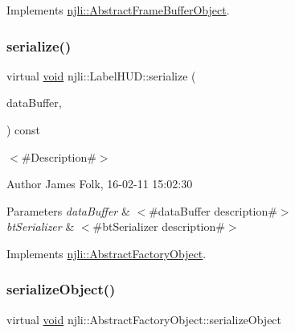 Implements \mbox{\hyperlink{classnjli_1_1_abstract_frame_buffer_object_aa75a537f5745e4be8f749892d195b43c}{njli\+::\+Abstract\+Frame\+Buffer\+Object}}.

\mbox{\label{classnjli_1_1_label_h_u_d_abfd2e24d591c7a69305b30d271b38a77}} 
\subsubsection{\texorpdfstring{serialize()}{serialize()}}
{\footnotesize\ttfamily virtual \mbox{\hyperlink{_thread_8h_af1e856da2e658414cb2456cb6f7ebc66}{void}} njli\+::\+Label\+H\+U\+D\+::serialize (\begin{DoxyParamCaption}\item[{\mbox{\hyperlink{_thread_8h_af1e856da2e658414cb2456cb6f7ebc66}{void}} $\ast$}]{data\+Buffer,  }\item[{bt\+Serializer $\ast$}]{ }\end{DoxyParamCaption}) const\hspace{0.3cm}{\ttfamily [virtual]}}



$<$\#\+Description\#$>$ 

\begin{DoxyAuthor}{Author}
James Folk, 16-\/02-\/11 15\+:02\+:30
\end{DoxyAuthor}

\begin{DoxyParams}{Parameters}
{\em data\+Buffer} & $<$\#data\+Buffer description\#$>$ \\
\hline
{\em bt\+Serializer} & $<$\#bt\+Serializer description\#$>$ \\
\hline
\end{DoxyParams}


Implements \mbox{\hyperlink{classnjli_1_1_abstract_factory_object_aad2fbe86fb3bdecf02918a96b9c57976}{njli\+::\+Abstract\+Factory\+Object}}.

\mbox{\label{classnjli_1_1_label_h_u_d_a4fc4bcd9d1930911474210c047372fc0}} 
\subsubsection{\texorpdfstring{serialize\+Object()}{serializeObject()}}
{\footnotesize\ttfamily virtual \mbox{\hyperlink{_thread_8h_af1e856da2e658414cb2456cb6f7ebc66}{void}} njli\+::\+Abstract\+Factory\+Object\+::serialize\+Object}

